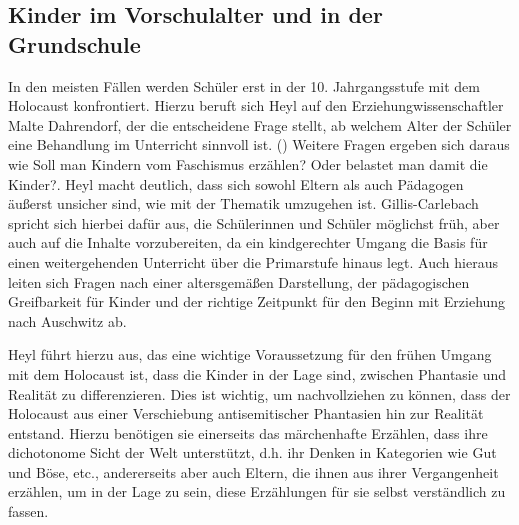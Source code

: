 \subsection{Kinder im Vorschulalter und in der Grundschule}
In den meisten Fällen werden Schüler erst in der 10. Jahrgangsstufe mit dem Holocaust konfrontiert.
Hierzu beruft sich Heyl auf den Erziehungwissenschaftler Malte Dahrendorf, der die entscheidene Frage stellt, ab welchem Alter der Schüler eine Behandlung im Unterricht sinnvoll ist. (\cite[S.\,118]{IA96})
Weitere Fragen ergeben sich daraus wie \glqq Soll man Kindern vom Faschismus erzählen? Oder belastet man damit die Kinder?\grqq{}.
Heyl macht deutlich, dass sich sowohl Eltern als auch Pädagogen äußerst unsicher sind, wie mit der Thematik umzugehen ist.
Gillis-Carlebach spricht sich hierbei dafür aus, die Schülerinnen und Schüler möglichst früh, aber auch auf die Inhalte vorzubereiten, da ein kindgerechter Umgang die Basis für einen weitergehenden Unterricht über die Primarstufe hinaus legt.
Auch hieraus leiten sich Fragen nach einer altersgemäßen Darstellung, der pädagogischen Greifbarkeit für Kinder und der richtige Zeitpunkt für den Beginn mit \glqq Erziehung nach Auschwitz\grqq{} ab.

Heyl führt hierzu aus, das eine wichtige Voraussetzung für den frühen Umgang mit dem Holocaust ist, dass die Kinder in der Lage sind, zwischen Phantasie und Realität zu differenzieren.
Dies ist wichtig, um nachvollziehen zu können, dass der Holocaust aus einer Verschiebung antisemitischer Phantasien hin zur Realität entstand.
Hierzu benötigen sie einerseits das märchenhafte Erzählen, dass ihre dichotonome Sicht der Welt unterstützt, d.h.
ihr Denken in Kategorien wie Gut und Böse, etc., andererseits aber auch Eltern, die ihnen aus ihrer Vergangenheit erzählen, um in der Lage zu sein, diese Erzählungen für sie selbst verständlich zu fassen.
